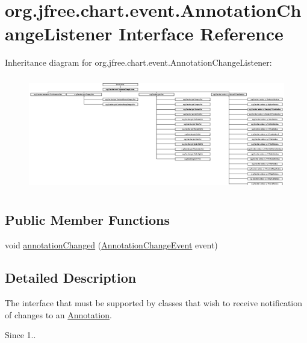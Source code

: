 \hypertarget{interfaceorg_1_1jfree_1_1chart_1_1event_1_1_annotation_change_listener}{}\section{org.\+jfree.\+chart.\+event.\+Annotation\+Change\+Listener Interface Reference}
\label{interfaceorg_1_1jfree_1_1chart_1_1event_1_1_annotation_change_listener}
Inheritance diagram for org.\+jfree.\+chart.\+event.\+Annotation\+Change\+Listener\+:\begin{figure}[H]
\begin{center}
\leavevmode
\includegraphics[height=4.985163cm]{interfaceorg_1_1jfree_1_1chart_1_1event_1_1_annotation_change_listener}
\end{center}
\end{figure}
\subsection*{Public Member Functions}
\begin{DoxyCompactItemize}
\item 
void \mbox{\hyperlink{interfaceorg_1_1jfree_1_1chart_1_1event_1_1_annotation_change_listener_ac7367f136960e9a914a759b69595c535}{annotation\+Changed}} (\mbox{\hyperlink{classorg_1_1jfree_1_1chart_1_1event_1_1_annotation_change_event}{Annotation\+Change\+Event}} event)
\end{DoxyCompactItemize}


\subsection{Detailed Description}
The interface that must be supported by classes that wish to receive notification of changes to an \mbox{\hyperlink{}{Annotation}}.

\begin{DoxySince}{Since}
1.. 
\end{DoxySince}


